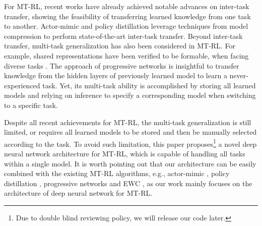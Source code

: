 \documentclass[letterpaper]{article} %
\begin{document}
For MT-RL, recent works have already achieved notable advances on inter-task transfer, showing the feasibility of transferring learned knowledge from one task to another. Actor-mimic \cite{parisotto16_actormimic} and policy distillation \cite{rusu2015policy} leverage techniques from model compression to perform state-of-the-art inter-task transfer. Beyond inter-task transfer, multi-task generalization has also been considered in MT-RL. For example, shared representations have been verified to be formable, when facing diverse tasks \cite{borsa2016learning, romoff2016deep}. The approach of progressive networks \cite{rusu2016progressive} is insightful to transfer knowledge from the hidden layers of previously learned model to learn a never-experienced task. Yet, its multi-task ability is accomplished by storing all learned models and relying on inference to specify a corresponding model when switching to a specific task.

Despite all recent achievements for MT-RL, the multi-task generalization is still limited, or requires all learned models to be stored and then be manually selected according to the task. To avoid such limitation, this paper proposes\footnote{Due to double blind reviewing policy, we will release our code later. } a novel deep neural network architecture for MT-RL, which is capable of handling all tasks within a single model. It is worth pointing out that our architecture can be easily combined with the existing MT-RL algorithms, e.g., actor-mimic \cite{parisotto16_actormimic}, policy distillation \cite{rusu2015policy}, progressive networks \cite{rusu2016progressive} and EWC \cite{kirkpatrick2017overcoming}, as our work mainly focuses on the architecture of deep neural network for MT-RL.
\end{document}
